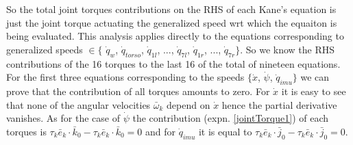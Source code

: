 \documentclass[a4paper,10pt]{article}
\begin{document}
So the total joint torques contributions on the RHS of each Kane's equation is just the joint torque actuating the generalized speed wrt which the equaiton is being evaluated. This analysis applies directly to the  equations corresponding to generalized speeds $\in \{$ $\dot{q}_w$, $\dot{q}_{torso}$, $\dot{q}_{1l}$, $...$, $\dot{q}_{7l}$, $\dot{q}_{1r}$, $...$, $\dot{q}_{7r} \}$. So we know the RHS contributions of the 16 torques to the last 16 of the total of nineteen equations. For the first three equations corresponding to the speeds $\{ \dot{x}$, $\dot\psi$, $\dot{q}_{imu} \}$ we can prove that the contribution of all torques amounts to zero. For $\dot{x}$ it is easy to see that none of the angular velocities $\bar\omega_k$ depend on $\dot{x}$ hence the partial derivative vanishes. As for the case of $\dot\psi$ the contribution (expn. \ref{jointTorque1}) of each torques is $\tau_k\bar{e}_k\cdot\bar{k}_0-\tau_k\bar{e}_k\cdot\bar{k}_0 = 0$ and for $\dot{q}_{imu}$ it is equal to $\tau_k\bar{e}_k\cdot\bar{j}_
0-\tau_k\bar{e}_k\cdot\bar{j}_0 = 0$.
\end{document}
